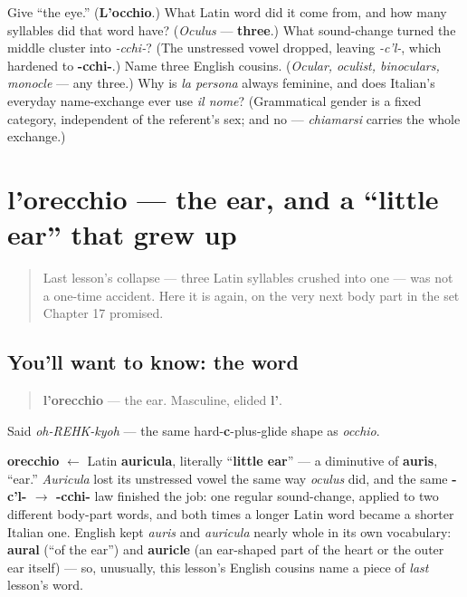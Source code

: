 \begin{tcolorbox}[breakable,colback=teal!4,colframe=teal!35!black,title={Before you move on}]
Give \textquotedblleft{}the eye.\textquotedblright{} (\textbf{L'occhio}.) What Latin word did it come from, and how many syllables did that word have? (\emph{Oculus} — \textbf{three}.) What sound-change turned the middle cluster into \emph{-cchi-}? (The unstressed vowel dropped, leaving \emph{-c'l-}, which hardened to \textbf{-cchi-}.) Name three English cousins. (\emph{Ocular, oculist, binoculars, monocle} — any three.) Why is \emph{la persona} always feminine, and does Italian's everyday name-exchange ever use \emph{il nome}? (Grammatical gender is a fixed category, independent of the referent's sex; and no — \emph{chiamarsi} carries the whole exchange.)
\end{tcolorbox}
\section[l'orecchio]{l'orecchio — the ear, and a \textquotedblleft{}little ear\textquotedblright{} that grew up}

\label{lesson:IT-C24-orecchio}



\begin{quote}
Last lesson's collapse — three Latin syllables crushed into one — was not a one-time accident. Here it is again, on the very next body part in the set Chapter 17 promised.
\end{quote}

\subsection*{You'll want to know: the word}
\begin{quote}
\textbf{l'orecchio} — the ear. Masculine, elided \textbf{l'}.
\end{quote}

Said \emph{oh-REHK-kyoh} — the same hard-\textbf{c}-plus-glide shape as \emph{occhio}.

\begin{cousinweb}
\textbf{orecchio} $\leftarrow$ Latin \textbf{auricula}, literally \textquotedblleft{}\textbf{little ear}\textquotedblright{} — a diminutive of \textbf{auris}, \textquotedblleft{}ear.\textquotedblright{} \emph{Auricula} lost its unstressed vowel the same way \emph{oculus} did, and the same \textbf{-c'l- $\to$ -cchi-} law finished the job: one regular sound-change, applied to two different body-part words, and both times a longer Latin word became a shorter Italian one. English kept \emph{auris} and \emph{auricula} nearly whole in its own vocabulary: \textbf{aural} (\textquotedblleft{}of the ear\textquotedblright{}) and \textbf{auricle} (an ear-shaped part of the heart or the outer ear itself) — so, unusually, this lesson's English cousins name a piece of \emph{last} lesson's word.
\end{cousinweb}

